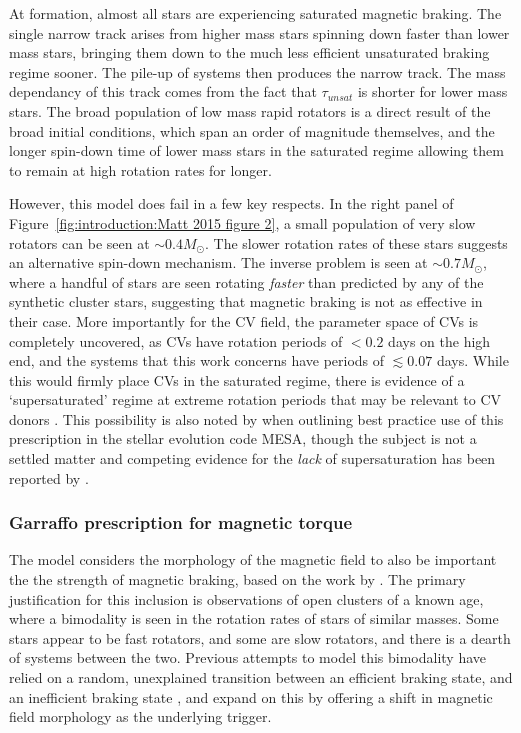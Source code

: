 At formation, almost all stars are experiencing saturated magnetic braking. The single narrow track arises from higher mass stars spinning down faster than lower mass stars, bringing them down to the much less efficient unsaturated braking regime sooner. The pile-up of systems then produces the narrow track. The mass dependancy of this track comes from the fact that $\tau_{unsat}$ is shorter for lower mass stars.
The broad population of low mass rapid rotators is a direct result of the broad initial conditions, which span an order of magnitude themselves, and the longer spin-down time of lower mass stars in the saturated regime allowing them to remain at high rotation rates for longer. 

However, this model does fail in a few key respects. In the right panel of Figure~\ref{fig:introduction:Matt 2015 figure 2}, a small population of very slow rotators can be seen at $\sim 0.4 M_\odot$. The slower rotation rates of these stars suggests an alternative spin-down mechanism. The inverse problem is seen at $\sim 0.7 M_\odot$, where a handful of stars are seen rotating {\it faster} than predicted by any of the synthetic cluster stars, suggesting that magnetic braking is not as effective in their case.
More importantly for the CV field, the parameter space of CVs is completely uncovered, as CVs have rotation periods of $< 0.2$ days on the high end, and the systems that this work concerns have periods of $\lesssim 0.07$ days. While this would firmly place CVs in the saturated regime, there is evidence of a `supersaturated' regime at extreme rotation periods that may be relevant to CV donors \citep{James2000, Wright2011, Argiroffi2016}. This possibility is also noted by \citet{Gossage2021} when outlining best practice use of this prescription in the stellar evolution code MESA, though the subject is not a settled matter and competing evidence for the {\it lack} of supersaturation has been reported by \citet{jeffries2011}.


\subsubsection{Garraffo prescription for magnetic torque}
\label{sect:introduction:Garraffo MB prescription}

The \citet{garraffo2018a} model considers the morphology of the magnetic field to also be important the the strength of magnetic braking, based on the work by \citet{garraffo2015}. The primary justification for this inclusion is observations of open clusters of a known age, where a bimodality is seen in the rotation rates of stars of similar masses. Some stars appear to be fast rotators, and some are slow rotators, and there is a dearth of systems between the two. 
Previous attempts to model this bimodality have relied on a random, unexplained transition between an efficient braking state, and an inefficient braking state \citep{spada2011,reiners2012, gallet2013}, and \citet{garraffo2018a} expand on this by offering a shift in magnetic field morphology as the underlying trigger.

